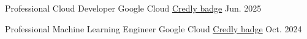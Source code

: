 

\begin{cvhonors}

  \cvhonor
    {Professional Cloud Developer} %
    {Google Cloud} %
    {\href{https://www.credly.com/badges/4ffbda64-5c4b-4952-95c7-cc39367f5c2b/public_url}{Credly badge}} %
    {Jun. 2025} %

  \cvhonor
    {Professional Machine Learning Engineer} %
    {Google Cloud} %
    {\href{https://www.credly.com/badges/1500027c-cfce-48f7-b3c3-7a17ac5f95c5/public_url}{Credly badge}} %
    {Oct. 2024} %

\end{cvhonors}
